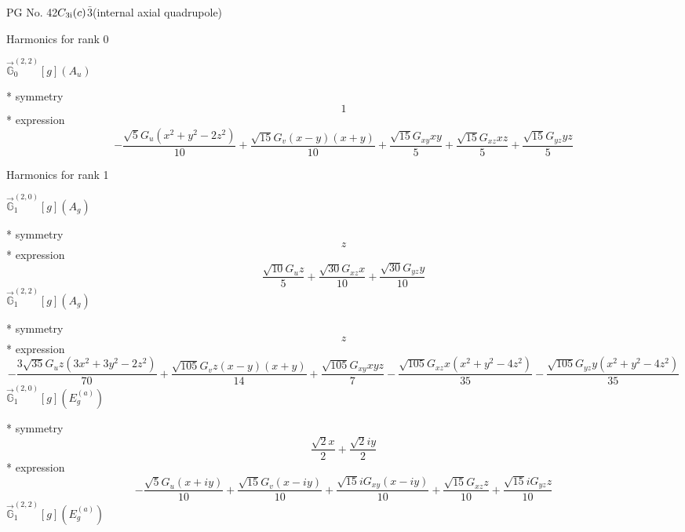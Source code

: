 \documentclass[fleqn,8pt]{jsarticle}
\begin{document}
\setcounter{MaxMatrixCols}{32}

\renewcommand{\tablename}{Table~}
\renewcommand{\figurename}{Figure~}
\begin{center}
\LARGE
PG No. 42\quad$C_{\rm 3i}(c)$\quad$\bar{3}$\quad[ trigonal ] (internal axial quadrupole)
\end{center}

\noindent * Harmonics for rank 0

\noindent\quad $\vec{\mathbb{G}}_{0}^{(2,2)}[g](A_{u})$

\noindent\quad ** symmetry
\begin{dmath*}
1
\end{dmath*}
\noindent\quad ** expression
\begin{dmath*}
- \frac{\sqrt{5} G_{u} \left(x^{2} + y^{2} - 2 z^{2}\right)}{10} + \frac{\sqrt{15} G_{v} \left(x - y\right) \left(x + y\right)}{10} + \frac{\sqrt{15} G_{xy} x y}{5} + \frac{\sqrt{15} G_{xz} x z}{5} + \frac{\sqrt{15} G_{yz} y z}{5}
\end{dmath*}

\noindent * Harmonics for rank 1

\noindent\quad $\vec{\mathbb{G}}_{1}^{(2,0)}[g](A_{g})$

\noindent\quad ** symmetry
\begin{dmath*}
z
\end{dmath*}
\noindent\quad ** expression
\begin{dmath*}
\frac{\sqrt{10} G_{u} z}{5} + \frac{\sqrt{30} G_{xz} x}{10} + \frac{\sqrt{30} G_{yz} y}{10}
\end{dmath*}
\noindent\quad $\vec{\mathbb{G}}_{1}^{(2,2)}[g](A_{g})$

\noindent\quad ** symmetry
\begin{dmath*}
z
\end{dmath*}
\noindent\quad ** expression
\begin{dmath*}
- \frac{3 \sqrt{35} G_{u} z \left(3 x^{2} + 3 y^{2} - 2 z^{2}\right)}{70} + \frac{\sqrt{105} G_{v} z \left(x - y\right) \left(x + y\right)}{14} + \frac{\sqrt{105} G_{xy} x y z}{7} - \frac{\sqrt{105} G_{xz} x \left(x^{2} + y^{2} - 4 z^{2}\right)}{35} - \frac{\sqrt{105} G_{yz} y \left(x^{2} + y^{2} - 4 z^{2}\right)}{35}
\end{dmath*}
\noindent\quad $\vec{\mathbb{G}}_{1}^{(2,0)}[g](E_{g}^{(a)})$

\noindent\quad ** symmetry
\begin{dmath*}
\frac{\sqrt{2} x}{2} + \frac{\sqrt{2} i y}{2}
\end{dmath*}
\noindent\quad ** expression
\begin{dmath*}
- \frac{\sqrt{5} G_{u} \left(x + i y\right)}{10} + \frac{\sqrt{15} G_{v} \left(x - i y\right)}{10} + \frac{\sqrt{15} i G_{xy} \left(x - i y\right)}{10} + \frac{\sqrt{15} G_{xz} z}{10} + \frac{\sqrt{15} i G_{yz} z}{10}
\end{dmath*}
\noindent\quad $\vec{\mathbb{G}}_{1}^{(2,2)}[g](E_{g}^{(a)})$
\end{document}
